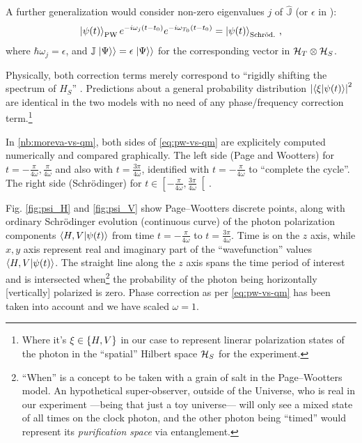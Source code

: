 A further generalization would consider non-zero eigenvalues $j$ of $\hat{\mathbb{J}}$
(or $\epsilon$ in \cite[eq. 16]{Lloyd:Time}):
\begin{equation}\label{eq:pw-vs-qm}
  \ket{\psi(t)}_{\mathrm{PW}} e^{-i\omega_{j}(t - t_{0})} e^{-i\omega_{T_0}(t - t_{0})} = \ket{\psi(t)}_{\mathrm{Schr\ddot{o}d.}} \,\text{,}
\end{equation}
where $\hbar\omega_j = \epsilon$,
and $\mathbb{J}\left.\left| \Psi \right\rangle\right\rangle = \epsilon \left.\left| \Psi \right\rangle\right\rangle$
for the corresponding vector in $\mathcal{H}_T \otimes \mathcal{H}_S$.

Physically, both correction terms merely
correspond to ``rigidly shifting the spectrum of $H_S$'' \parencite{Lloyd:Time}.
Predictions about a general probability distribution
$\abs{\braket{\xi}{\psi(t)}}^2$
are identical in the two models with no need of any phase/frequency correction term.\footnote{
  Where it's $\xi \in \qty{H, V}$
  in our case to represent linerar polarization states of the photon in
  the ``spatial'' Hilbert space $\mathcal{H}_S$
  for the experiment.
}

\begin{spacing}{1.5}
  In \ref{nb:moreva-vs-qm},
  both sides of \eqref{eq:pw-vs-qm} are
  explicitely computed numerically and compared graphically.
  The left side (Page and Wootters)
  for $t = -\frac{\pi}{4\omega}, \frac{\pi}{4\omega}$ and also with
  $t = \frac{3\pi}{4\omega}$, identified with $t = -\frac{\pi}{4\omega}$
  to ``complete the cycle''.
  The right side (Schr{\"o}dinger) for
  $t \in \left[-\frac{\pi}{4\omega}, \frac{3\pi}{4\omega}\right[$.
\end{spacing}

Fig. \ref{fig:psi_H} and \ref{fig:psi_V} show
Page--Wootters discrete points, along with
ordinary Schr{\"o}dinger evolution (continuous curve)
of the photon polarization components
$\braket{H,V}{\psi(t)}$
from time $t = -\frac{\pi}{4\omega}$
to $t = \frac{3\pi}{4\omega}$. Time is on the $z$ axis,
while $x, y$ axis represent real and imaginary part of
the ``wavefunction'' values $\braket{H,V}{\psi(t)}$.
The straight line along the $z$ axis
spans the time period of interest
and is intersected when\footnote{
  ``When'' is a concept to be taken with a grain of salt in the Page--Wootters model.
  An hypothetical super-observer, outside of the Universe,
  who is real in our experiment ---being that just a toy universe---
  will only see a mixed state of all times on the clock photon, and the other
  photon being ``timed'' would represent its \emph{purification space}
  via entanglement.
}
the probability of the photon being
horizontally [vertically] polarized is zero.
Phase correction as per \eqref{eq:pw-vs-qm} has been taken into account
and we have scaled $\omega=1$.


